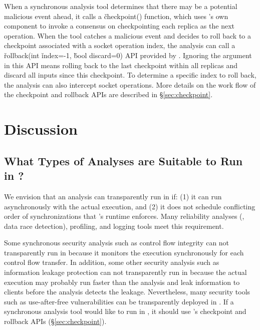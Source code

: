 When a synchronous analysis tool determines that there may be a potential 
malicious event ahead, 
it calls a \v{checkpoint()} function, which uses \xxx's own \paxos component to 
invoke a consensus on checkpointing each replica as the next operation. When 
the tool 
catches a malicious event and decides to roll back to a 
checkpoint associated with a socket operation index, the analysis can call a 
\v{rollback(int} \v{index=-1,} \v{bool discard=0)} API provided 
by \xxx. Ignoring the argument in this API means rolling back to the last 
checkpoint within all replicas and discard all inputs since this checkpoint. To 
determine a specific index to roll back, the analysis can also intercept socket 
operations. More details on the work flow of the checkpoint and rollback APIs 
are described in \S\ref{sec:checkpoint}.



\section{Discussion} \label{sec:discuss}

\subsection{What Types of Analyses are Suitable to Run in \xxx?} 
\label{sec:analysis-types}

We envision that an analysis can transparently run in \xxx if: (1) it can run 
asynchronously with the actual execution, and (2) it does not schedule 
conflicting order of \pthread synchronizations that \xxx's \dmt runtime 
enforces. Many reliability analyses (\eg, data race detection), profiling, 
and logging tools meet this requirement.

Some synchronous security analysis such as control 
flow integrity can not transparently run in \xxx because it monitors the 
execution 
synchronously for each control flow transfer. In addition, some other security 
analysis such as information leakage protection can not transparently run in 
\xxx 
because the actual execution may probably run faster than the 
analysis and leak information to clients before the analysis detects the 
leakage. Nevertheless, many security tools such as use-after-free 
vulnerabilities can be transparently deployed in \xxx. If a synchronous 
analysis 
tool would like to run in \xxx, it should use \xxx's checkpoint 
and rollback APIs (\S\ref{sec:checkpoint}).


